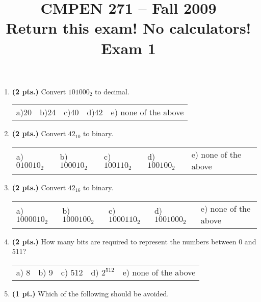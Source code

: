 \documentclass{article}
\begin{document}
\newcommand{\SOPmin}{${\rm SOP}_{\rm min} \ $}
\newcommand{\POSmin}{${\rm POS}_{\rm min} \ $}
\newcommand{\bs}{\backslash}


\title{
\Huge{CMPEN 271 -- Fall 2009}\\
\normalsize{Return this exam!  No calculators!}\\
\normalsize{Exam 1}\\
 }
\date{}

\maketitle{}


\begin{enumerate}

\item {\bf (2 pts.)} Convert $101000_2$ to decimal.

\begin{tabular}{p{0.7in} p{0.7in} p{0.7in} p{0.7in} l}
a)20 & b)24  & c)40  & d)42  & e) none of the above
\end{tabular}

\item {\bf (2 pts.)} Convert $42_{10}$ to binary.

\begin{tabular}{p{0.7in} p{0.7in} p{0.7in} p{0.7in} l}
a) $010010_2$ & b) $100010_2$ & c) $100110_2$ & d) $100100_2$ & e) none of the above
\end{tabular}

\item {\bf (2 pts.)} Convert $42_{16}$ to binary.

\begin{tabular}{p{0.7in} p{0.7in} p{0.7in} p{0.7in} l}
a) $1000010_2$ & b) $1000100_2$ & c) $1000110_2$ & d) $1001000_2$ & e) none of the above
\end{tabular}

\item {\bf (2 pts.)} How many bits are required to represent the numbers
between 0 and 511?

\begin{tabular}{p{0.7in} p{0.7in} p{0.7in} p{0.7in} l}
a) 8 & b) 9 & c) 512 & d) $2^{512}$ & e) none of the above
\end{tabular}

\item {\bf (1 pt.)} Which of the following should be avoided.


\end{enumerate}
\end{document}
